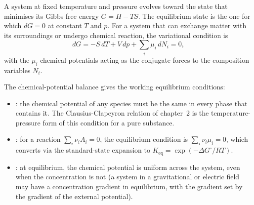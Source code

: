 A system at fixed temperature and pressure evolves toward the state
that minimises its Gibbs free energy $G = H - TS$. The equilibrium
state is the one for which $dG = 0$ at constant $T$ and $p$. For a
system that can exchange matter with its surroundings or undergo
chemical reaction, the variational condition is
\[
dG = -S \,dT + V \,dp + \sum_i \mu_i \,dN_i = 0,
\]
with the $\mu_i$ chemical potentials acting as the conjugate forces
to the composition variables $N_i$.

The chemical-potential balance gives the working equilibrium
conditions:

\begin{itemize}[leftmargin=*]
  \item {}: the chemical potential of any
    species must be the same in every phase that contains it. The
    Clausius-Clapeyron relation of chapter~2 is the temperature-
    pressure form of this condition for a pure substance.
  \item {}: for a reaction $\sum_i \nu_i
    A_i = 0$, the equilibrium condition is $\sum_i \nu_i \mu_i = 0$,
    which converts via the standard-state expansion to $K_{\text{eq}}
    = \exp(-\Delta G^\circ/RT)$.
  \item {}: at equilibrium, the
    chemical potential is uniform across the system, even when the
    concentration is not (a system in a gravitational or electric
    field may have a concentration gradient in equilibrium, with
    the gradient set by the gradient of the external potential).
\end{itemize}

